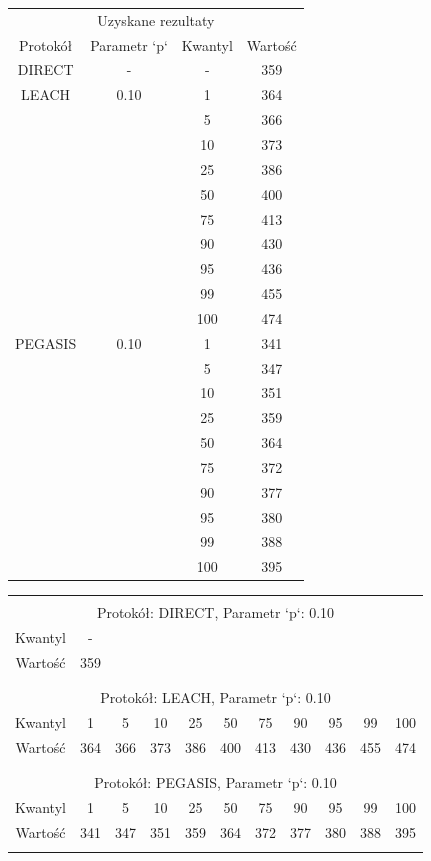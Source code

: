 \documentclass[a4paper,12pt,twoside,openany]{report}
\begin{document}
\begin{longtable}{*{4}{c}}
\toprule
\multicolumn{4}{c}{Uzyskane rezultaty} \\
Protokół	& Parametr `p`	& Kwantyl	& Wartość \\
\midrule
\endhead
DIRECT	& - 	& -	& 359 \\*
\midrule
LEACH	& 0.10	& 1	& 364 \\*
	&	& 5	& 366 \\*
	&	& 10	& 373 \\*
	&	& 25	& 386 \\*
	&	& 50	& 400 \\*
	&	& 75	& 413 \\*
	&	& 90	& 430 \\*
	&	& 95	& 436 \\*
	&	& 99	& 455 \\*
	&	& 100	& 474 \\*
\midrule
PEGASIS	& 0.10	& 1	& 341 \\*
	&	& 5	& 347 \\*
	&	& 10	& 351 \\*
	&	& 25	& 359 \\*
	&	& 50	& 364 \\*
	&	& 75	& 372 \\*
	&	& 90	& 377 \\*
	&	& 95	& 380 \\*
	&	& 99	& 388 \\*
	&	& 100	& 395 \\*
\bottomrule
\end{longtable}

\begin{longtable}{*{11}{c}}
\toprule \\*
\multicolumn{11}{c}{Protokół: DIRECT, Parametr `p`: 0.10} \\*
Kwantyl	& -	\\*
Wartość	& 359	\\*
\midrule \\*
\\*
\multicolumn{11}{c}{Protokół: LEACH, Parametr `p`: 0.10} \\*
Kwantyl	& 1	& 5	& 10	& 25	& 50	& 75	& 90	& 95	& 99	& 100	\\*
Wartość	& 364	& 366	& 373	& 386	& 400	& 413	& 430	& 436	& 455	& 474	\\*
\midrule \\*
\\*
\multicolumn{11}{c}{Protokół: PEGASIS, Parametr `p`: 0.10} \\*
Kwantyl	& 1	& 5	& 10	& 25	& 50	& 75	& 90	& 95	& 99	& 100	\\*
Wartość	& 341	& 347	& 351	& 359	& 364	& 372	& 377	& 380	& 388	& 395	\\*	
\bottomrule \\*
\end{longtable}
\end{document}
